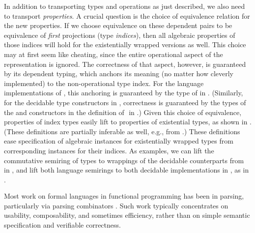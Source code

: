 \documentclass[acmsmall,screen,timestamp,anonymous,review]{acmart}
\begin{document}
In addition to transporting types and operations as just described, we also need to transport \emph{properties}.
A crucial question is the choice of equivalence relation for the new properties.
If we choose equivalence on these dependent pairs to be equivalence of \emph{first} projections (type \emph{indices}), then all algebraic properties of those indices will hold for the existentially wrapped versions as well.
This choice may at first seem like cheating, since the entire operational aspect of the representation is ignored.
The correctness of that aspect, however, is guaranteed by its dependent typing, which anchors its meaning (no matter how cleverly implemented) to the non-operational type index.
For the language implementations of , this anchoring is guaranteed by the type of  in .
(Similarly, for the decidable type constructors in , correctness is guaranteed by the types of the  and  constructors in the definition of ‌ in .)
Given this choice of equivalence, properties of index types easily lift to properties of existential types, as shown in .
(These definitions are partially inferable as well, e.g., from .)
These definitions ease specification of algebraic instances for existentially wrapped types from corresponding instances for their indices.
\rnc{}
As examples, we can lift the commutative semiring of types to wrappings of the decidable counterparts from  in , and lift both language semirings to both decidable implementations in , as in .



Most work on formal languages in functional programming has been in parsing, particularly via parsing combinators \citep{Hutton1996monadic, Leijen2001parsec, Swierstra2008combinator}.
Such work typically concentrates on usability, composability, and sometimes efficiency, rather than on simple semantic specification and verifiable correctness.
\end{document}
